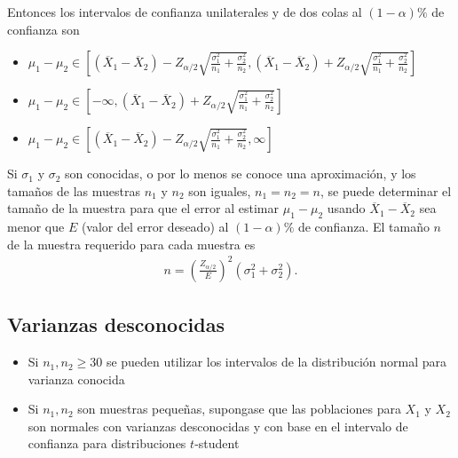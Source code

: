 \begin{itemize}
\begin{enumerate}
Entonces los intervalos de confianza unilaterales y de dos colas al $\left(1-\alpha\right)\%$ de confianza son 

\begin{itemize}
\item $\mu_{1}-\mu_{2}\in \left[\left(\overline{X}_{1}-\overline{X}_{2}\right)-Z_{\alpha/2}\sqrt{\frac{\sigma_{1}^{2}}{n_{1}}+\frac{\sigma_{2}^{2}}{n_{2}}},\left(\overline{X}_{1}-\overline{X}_{2}\right)+Z_{\alpha/2}\sqrt{\frac{\sigma_{1}^{2}}{n_{1}}+\frac{\sigma_{2}^{2}}{n_{2}}}\right]$

\item $\mu_{1}-\mu_{2}\in \left[-\infty,\left(\overline{X}_{1}-\overline{X}_{2}\right)+Z_{\alpha/2}\sqrt{\frac{\sigma_{1}^{2}}{n_{1}}+\frac{\sigma_{2}^{2}}{n_{2}}}\right]$

\item $\mu_{1}-\mu_{2}\in \left[\left(\overline{X}_{1}-\overline{X}_{2}\right)-Z_{\alpha/2}\sqrt{\frac{\sigma_{1}^{2}}{n_{1}}+\frac{\sigma_{2}^{2}}{n_{2}}},\infty\right]$

\end{itemize}

\begin{Note}
Si $\sigma_{1}$ y $\sigma_{2}$ son conocidas, o por lo menos se conoce una aproximaci\'on, y los tama\~nos de las muestras $n_{1}$ y $n_{2}$ son iguales, $n_{1}=n_{2}=n$, se puede determinar el tama\~no de la muestra para que el error al estimar $\mu_{1}-\mu_{2}$ usando $\overline{X}_{1}-\overline{X}_{2}$ sea menor que $E$ (valor del error deseado) al $\left(1-\alpha\right)\%$ de confianza. El tama\~no $n$ de la muestra requerido para cada muestra es
\begin{eqnarray*}
n=\left(\frac{Z_{\alpha/2}}{E}\right)^{2}\left(\sigma_{1}^{2}+\sigma_{2}^{2}\right).
\end{eqnarray*}

\end{Note}
\subsection*{Varianzas desconocidas}

\begin{itemize}
\item Si $n_{1},n_{2}\geq30$ se pueden utilizar los intervalos de la distribuci\'on normal para varianza conocida

\item Si $n_{1},n_{2}$ son muestras peque\~nas, supongase que las poblaciones para $X_{1}$ y $X_{2}$ son normales con varianzas desconocidas y con base en el intervalo de confianza para distribuciones $t$-student
\end{itemize}


\end{enumerate}
\end{itemize}
